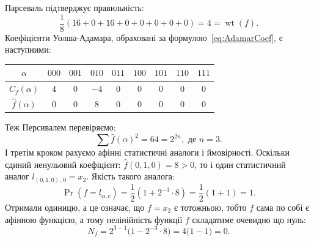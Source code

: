 \noindent Парсеваль підтверджує правильність:
\begin{equation*}
    \frac{1}{8}(16 + 0 + 16 + 0 + 0 + 0 + 0 + 0) = 4 = \operatorname{wt}(f).
\end{equation*}
Коефіцієнти Уолша-Адамара, обраховані за формулою~\eqref{eq:AdamarCoef}, є наступними:
\begin{center}
    \renewcommand{\arraystretch}{1.2}
    \begin{tabular}{c|cccccccc}
        $\alpha$          & $000$ & $001$ & $010$ & $011$ & $100$ & $101$ & $110$ & $111$ \\
        \hline
        $C_f(\alpha)$     & $4$   & $0$   & $-4$  & $0$   & $0$   & $0$   & $0$   & $0$   \\
        $\hat{f}(\alpha)$ & $0$   & $0$   & $8$   & $0$   & $0$   & $0$   & $0$   & $0$
    \end{tabular}
\end{center}
Теж Персивалем перевіряємо:
\begin{equation*}
    \sum \hat{f}(\alpha)^2 = 64 = 2^{2n}, \text{ де } n=3.
\end{equation*}
І третім кроком рахуємо афінні статистичні аналоги і ймовірності. Оскільки єдиний ненульовий коефіцієнт: 
$\hat{f}(0,1,0) = 8 > 0$, то і один статистичний аналог $l_{(0,1,0),\,0} = x_2$. Якість такого аналога:
\begin{equation*}
    \Pr(f = l_{\alpha,c}) = \frac{1}{2}(1 + 2^{-3}\cdot 8) = \frac{1}{2}(1 + 1) = 1.
\end{equation*}
Отримали одиницю, а це означає, що $f = x_2$ є тотожньою, тобто $f$ сама по собі є афінною функцією, а тому 
нелінійність функції $f$ складатиме очевидно що нуль:
\begin{equation*}
    N_f = 2^{3-1}\big(1 - 2^{-3}\cdot 8\big) = 4\big(1 - 1\big) = 0.
\end{equation*}
